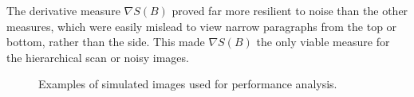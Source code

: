 The derivative measure $\nabla S(B)$ proved far more resilient to noise than the
other measures, which were easily mislead to view narrow paragraphs from the
top or bottom, rather than the side.
This made $\nabla S(B)$ the only viable measure for the hierarchical scan or noisy
images.

\begin{comment}
The entropy measure $E(B)$ performed significantly worse in all the above
measures.  $S(B)$ and $S_d(B)$ always responded well with the $S(B)$ measure
deteriorating rapidly as the image became noisier. CHECK JOEY.  $S_d(B)$
responded best even in presence of noise and is also more efficient to compute.
The confidence of each of the vanishing points with regard to the binarised text
in \reffig{runbin} is plotted in \reffig{ppmap}, where darker pixels represent a
larger squared-sum, and a more likely vanishing point.
\end{comment}


\begin{figure}[t!]
\centering
\begin{center}
\hspace*{3mm}
\hspace*{3mm}
\end{center}
\vspace*{0mm}
\caption{Examples of simulated images used for performance analysis.}
\label{simimages}
\end{figure}

